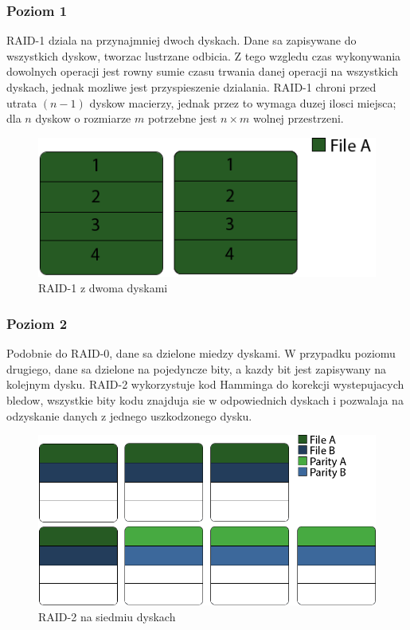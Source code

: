 \subsubsection{Poziom 1}
RAID-1 dziala na przynajmniej dwoch dyskach. Dane sa zapisywane do wszystkich dyskow, tworzac lustrzane odbicia. Z tego wzgledu czas wykonywania dowolnych operacji jest rowny sumie czasu trwania danej operacji na wszystkich dyskach, jednak mozliwe jest przyspieszenie dzialania. RAID-1 chroni przed utrata $(n-1)$ dyskow macierzy, jednak przez to wymaga duzej ilosci miejsca; dla $n$ dyskow o rozmiarze $m$ potrzebne jest $n\times m$ wolnej przestrzeni.
\begin{figure}[h!]
        \centering
        \includegraphics[scale=0.8]{raid-1.png}
        \caption{RAID-1 z dwoma dyskami}
        \label{fig:raid1}

\end{figure}

\subsubsection{Poziom 2}
Podobnie do RAID-0, dane sa dzielone miedzy dyskami. W przypadku poziomu drugiego, dane sa dzielone na pojedyncze bity, a kazdy bit jest zapisywany na kolejnym dysku. RAID-2 wykorzystuje kod Hamminga do korekcji wystepujacych bledow, wszystkie bity kodu znajduja sie w odpowiednich dyskach i  pozwalaja na odzyskanie danych z jednego uszkodzonego dysku. 
\begin{figure}[h!tb]
        \centering
        \includegraphics[scale=0.8]{raid-2.png}
        \caption{RAID-2 na siedmiu dyskach}
        \label{fig:raid2}
\end{figure}
\newpage
